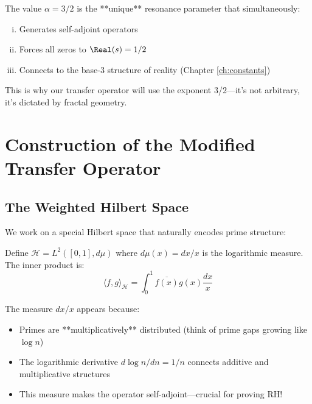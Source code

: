 \begin{theorem}\label{thm:alpha-three-halves}
The value $\alpha = 3/2$ is the **unique** resonance parameter that simultaneously:
\begin{enumerate}[(i)]
\item Generates self-adjoint operators
\item Forces all zeros to $\Real(s) = 1/2$
\item Connects to the base-3 structure of reality (Chapter \ref{ch:constants})
\end{enumerate}
\end{theorem}

This is why our transfer operator will use the exponent 3/2—it's not arbitrary, it's dictated by fractal geometry.

\section{Construction of the Modified Transfer Operator}

\subsection{The Weighted Hilbert Space}

We work on a special Hilbert space that naturally encodes prime structure:

\begin{defn}\label{def:log-hilbert-space}
Define $\mathcal{H} = L^2([0,1], d\mu)$ where $d\mu(x) = dx/x$ is the logarithmic measure. The inner product is:
\begin{equation}
\langle f, g \rangle_{\mathcal{H}} = \int_0^1 \overline{f(x)} g(x) \frac{dx}{x}
\end{equation}
\end{defn}

\begin{intuitive}
The measure $dx/x$ appears because:
\begin{itemize}
\item Primes are **multiplicatively** distributed (think of prime gaps growing like $\log n$)
\item The logarithmic derivative $d\log n / dn = 1/n$ connects additive and multiplicative structures
\item This measure makes the operator self-adjoint—crucial for proving RH!
\end{itemize}
\end{intuitive}

